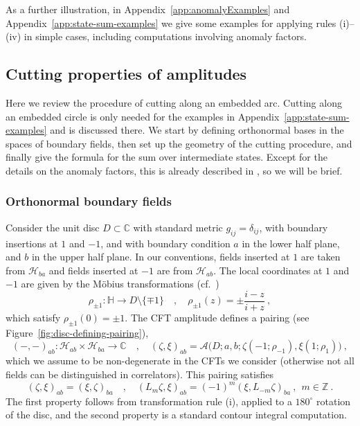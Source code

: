 \documentclass[11pt,a4paper]{article}
\numberwithin{equation}{section}
\begin{document}
As a further illustration, in Appendix~\ref{app:anomalyExamples} and Appendix~\ref{app:state-sum-examples} we give some examples for applying rules (i)--(iv) in simple cases, including computations involving anomaly factors. 
 

\subsection{Cutting properties of amplitudes}\label{sec:cutting-amplitude}

Here we review the procedure of cutting along an embedded arc. Cutting along an embedded circle is only needed for the examples in Appendix~\ref{app:state-sum-examples} and is discussed there.
We start by defining orthonormal bases in the spaces of boundary fields, then set up the geometry of the cutting procedure, and finally give the formula for the sum over intermediate states. Except for the details on the anomaly factors, this is already described in \cite[Sec.\,7.1]{Brehm:2021wev}, so we will be brief.

\subsubsection{Orthonormal boundary fields}

Consider the unit disc $D \subset \mathbb{C}$ with standard metric $g_{ij} = \delta_{ij}$, with boundary insertions at $1$ and $-1$, and 
with boundary condition $a$ in the lower half plane, and $b$ in the upper half plane. In our conventions, fields inserted at $1$ are taken from $\mathcal{H}_{ba}$ and fields inserted at $-1$ are from $\mathcal{H}_{ab}$. The local coordinates at $1$ and $-1$ are given by the Möbius transformations (cf.\ \cite[Eqn.\,7.4]{Brehm:2021wev})
\begin{equation}\label{eq:rho+-1}
\rho_{\pm 1} : \mathbb{H} \to D \setminus \{ \mp 1 \}
\quad , \quad
\rho_{\pm 1}(z) = \pm \frac{i-z}{i+z} \ ,
\end{equation}
which satisfy $\rho_{\pm 1}(0) = \pm 1$. 
The CFT amplitude defines a pairing (see Figure~\ref{fig:disc-defining-pairing}),
\begin{equation}\label{eq:disc-pairing}
(-,-)_{ab} : \mathcal{H}_{ab} \times \mathcal{H}_{ba} \to \mathbb{C}
\quad,\quad
(\zeta,\xi)_{ab} = \mathcal{A}\big(D;a,b;\zeta(-1;\rho_{-1}),\xi(1;\rho_{1})\big)
\ ,
\end{equation}
which we assume to be non-degenerate in the CFTs we consider (otherwise not all fields can be distinguished in correlators). This pairing satisfies
\begin{equation}\label{eq:disc-pairing-properties}
(\zeta,\xi)_{ab} = (\xi,\zeta)_{ba}
\quad , \quad
(L_m \zeta,\xi)_{ab} = (-1)^m (\xi,L_{-m} \zeta)_{ba}
~,~~ m \in \mathbb{Z}
\ .
\end{equation}
The first property follows from transformation rule (i), applied to a $180^\circ$  rotation of the disc, and the second property is a standard contour integral computation.
\end{document}
